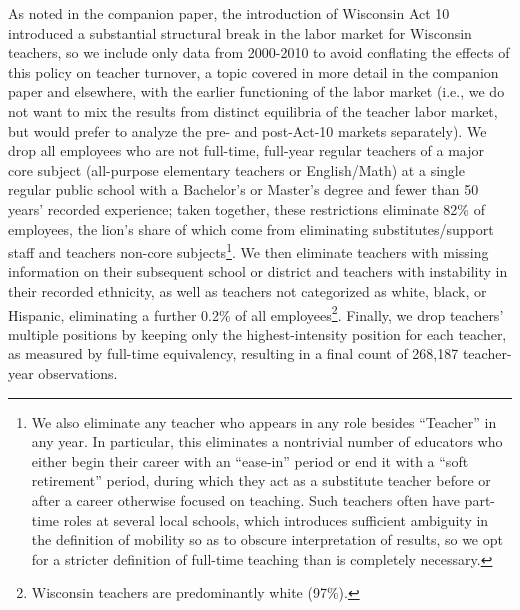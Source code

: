 \documentclass[12pt,]{article}
\let\rmarkdownfootnote\footnote%
\def\footnote{\protect\rmarkdownfootnote}
\begin{document}
As noted in the companion paper, the introduction of Wisconsin Act 10
introduced a substantial structural break in the labor market for
Wisconsin teachers, so we include only data from 2000-2010 to avoid
conflating the effects of this policy on teacher turnover, a topic
covered in more detail in the companion paper and elsewhere, with the
earlier functioning of the labor market (i.e., we do not want to mix the
results from distinct equilibria of the teacher labor market, but would
prefer to analyze the pre- and post-Act-10 markets separately). We drop
all employees who are not full-time, full-year regular teachers of a
major core subject (all-purpose elementary teachers or English/Math) at
a single regular public school with a Bachelor's or Master's degree and
fewer than 50 years' recorded experience; taken together, these
restrictions eliminate 82\% of employees, the lion's share of which come
from eliminating substitutes/support staff and teachers non-core
subjects\footnote{We also eliminate any teacher who appears in any role
  besides ``Teacher'' in any year. In particular, this eliminates a
  nontrivial number of educators who either begin their career with an
  ``ease-in'' period or end it with a ``soft retirement'' period, during
  which they act as a substitute teacher before or after a career
  otherwise focused on teaching. Such teachers often have part-time
  roles at several local schools, which introduces sufficient ambiguity
  in the definition of mobility so as to obscure interpretation of
  results, so we opt for a stricter definition of full-time teaching
  than is completely necessary.}. We then eliminate teachers with
missing information on their subsequent school or district and teachers
with instability in their recorded ethnicity, as well as teachers not
categorized as white, black, or Hispanic, eliminating a further 0.2\% of
all employees\footnote{Wisconsin teachers are predominantly white
  (97\%).}. Finally, we drop teachers' multiple positions by keeping
only the highest-intensity position for each teacher, as measured by
full-time equivalency, resulting in a final count of 268,187
teacher-year observations.
\end{document}
